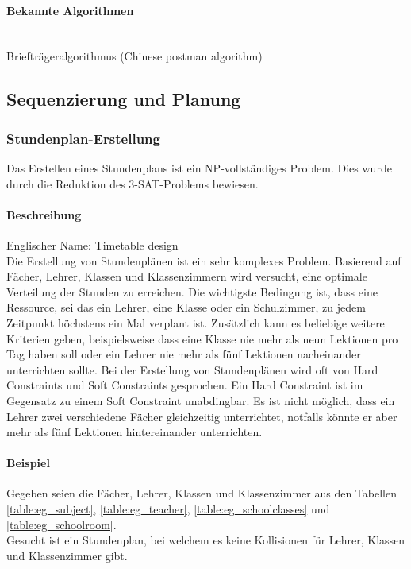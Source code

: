 	\paragraph{Bekannte Algorithmen}\mbox{}\\
	Briefträgeralgorithmus (Chinese postman algorithm)

\subsection{Sequenzierung und Planung}\label{sequencing_scheduling}

	\subsubsection{Stundenplan-Erstellung}\label{tsp}
	Das Erstellen eines Stundenplans ist ein NP-vollständiges Problem. Dies wurde durch die Reduktion des 3-SAT-Problems bewiesen.

	\paragraph{Beschreibung}
	Englischer Name: Timetable design\\
	Die Erstellung von Stundenplänen ist ein sehr komplexes Problem. Basierend auf Fächer, Lehrer, Klassen und Klassenzimmern wird versucht, eine optimale Verteilung der Stunden zu 
	erreichen. Die wichtigste Bedingung ist, dass eine Ressource, sei das ein Lehrer, eine Klasse oder ein Schulzimmer, zu jedem Zeitpunkt höchstens ein Mal verplant ist. 
	Zusätzlich kann es beliebige weitere Kriterien geben, beispielsweise dass eine Klasse nie mehr als neun Lektionen pro Tag haben soll oder ein Lehrer nie mehr als 
	fünf Lektionen nacheinander unterrichten sollte. Bei der Erstellung von Stundenplänen wird oft von Hard Constraints und Soft Constraints gesprochen. Ein Hard Constraint ist im Gegensatz zu 
	einem Soft Constraint unabdingbar. Es ist nicht möglich, dass ein Lehrer zwei verschiedene Fächer gleichzeitig unterrichtet, notfalls könnte er aber mehr als fünf Lektionen hintereinander 
	unterrichten. \cite{Abramson92aparallel} \cite{Abramson91constructingschool} \cite{framework_timetabling} \cite{time_table_constraint_opti_ea}

	\paragraph{Beispiel} Gegeben seien die Fächer, Lehrer, Klassen und Klassenzimmer aus den Tabellen \ref{table:eg_subject}, \ref{table:eg_teacher}, \ref{table:eg_schoolclasses} und \ref{table:eg_schoolroom}.\\
Gesucht ist ein Stundenplan, bei welchem es keine Kollisionen für Lehrer, Klassen und Klassenzimmer gibt.

